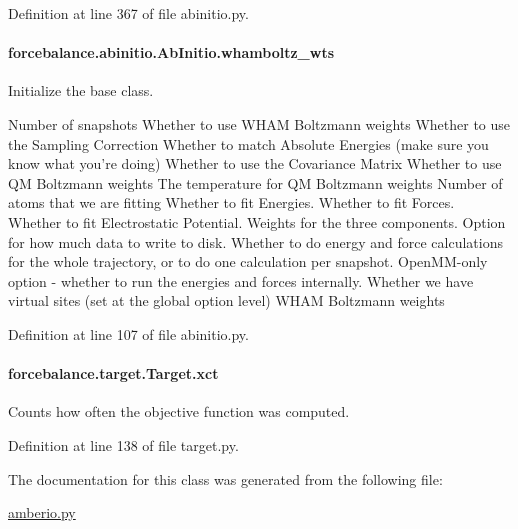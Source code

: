 Definition at line 367 of file abinitio.\-py.

\hypertarget{classforcebalance_1_1abinitio_1_1AbInitio_a885e7ef58b9e7c6abbc24321e5f3c61a}{
\paragraph[{whamboltz\-\_\-wts}]{\setlength{\rightskip}{0pt plus 5cm}forcebalance.\-abinitio.\-Ab\-Initio.\-whamboltz\-\_\-wts\hspace{0.3cm}{\ttfamily [inherited]}}}\label{classforcebalance_1_1abinitio_1_1AbInitio_a885e7ef58b9e7c6abbc24321e5f3c61a}


Initialize the base class. 

Number of snapshots Whether to use W\-H\-A\-M Boltzmann weights Whether to use the Sampling Correction Whether to match Absolute Energies (make sure you know what you're doing) Whether to use the Covariance Matrix Whether to use Q\-M Boltzmann weights The temperature for Q\-M Boltzmann weights Number of atoms that we are fitting Whether to fit Energies. Whether to fit Forces. Whether to fit Electrostatic Potential. Weights for the three components. Option for how much data to write to disk. Whether to do energy and force calculations for the whole trajectory, or to do one calculation per snapshot. Open\-M\-M-\/only option -\/ whether to run the energies and forces internally. Whether we have virtual sites (set at the global option level) W\-H\-A\-M Boltzmann weights 

Definition at line 107 of file abinitio.\-py.

\hypertarget{classforcebalance_1_1target_1_1Target_aad2e385cfbf7b4a68f1c2cb41133fe82}{
\paragraph[{xct}]{\setlength{\rightskip}{0pt plus 5cm}forcebalance.\-target.\-Target.\-xct\hspace{0.3cm}{\ttfamily [inherited]}}}\label{classforcebalance_1_1target_1_1Target_aad2e385cfbf7b4a68f1c2cb41133fe82}


Counts how often the objective function was computed. 



Definition at line 138 of file target.\-py.



The documentation for this class was generated from the following file\-:\begin{DoxyCompactItemize}
\item 
\hyperlink{amberio_8py}{amberio.\-py}\end{DoxyCompactItemize}
